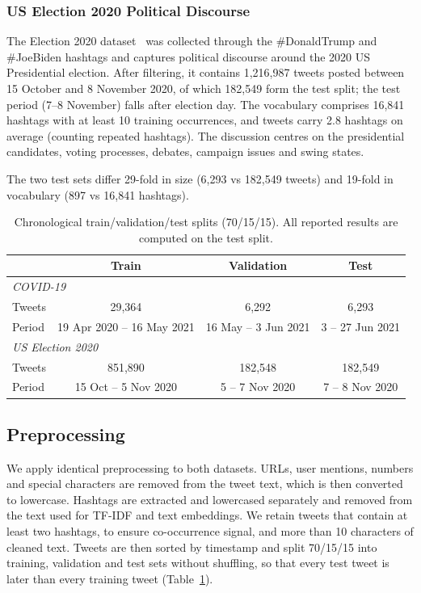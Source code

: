 \documentclass[pdflatex,sn-mathphys-num]{sn-jnl}%
\begin{document}
\subsubsection{US Election 2020 Political Discourse}\label{subsubsec5}

The Election 2020 dataset~\cite{election_kaggle} was collected through the \#DonaldTrump and \#JoeBiden hashtags and captures political discourse around the 2020 US Presidential election. After filtering, it contains 1,216,987 tweets posted between 15 October and 8 November 2020, of which 182,549 form the test split; the test period (7--8 November) falls after election day. The vocabulary comprises 16,841 hashtags with at least 10 training occurrences, and tweets carry 2.8 hashtags on average (counting repeated hashtags). The discussion centres on the presidential candidates, voting processes, debates, campaign issues and swing states.

The two test sets differ 29-fold in size (6,293 vs 182,549 tweets) and 19-fold in vocabulary (897 vs 16,841 hashtags).

\begin{table}[t]
\centering
\caption{Chronological train/validation/test splits (70/15/15). All reported results are computed on the test split.}
\label{tab:splits}
\begin{tabular}{lccc}
\toprule
 & Train & Validation & Test \\
\midrule
\multicolumn{4}{l}{\textit{COVID-19}} \\
Tweets & 29,364 & 6,292 & 6,293 \\
Period & 19 Apr 2020 -- 16 May 2021 & 16 May -- 3 Jun 2021 & 3 -- 27 Jun 2021 \\
\midrule
\multicolumn{4}{l}{\textit{US Election 2020}} \\
Tweets & 851,890 & 182,548 & 182,549 \\
Period & 15 Oct -- 5 Nov 2020 & 5 -- 7 Nov 2020 & 7 -- 8 Nov 2020 \\
\bottomrule
\end{tabular}
\end{table}

\subsection{Preprocessing}\label{subsec14}

We apply identical preprocessing to both datasets. URLs, user mentions, numbers and special characters are removed from the tweet text, which is then converted to lowercase. Hashtags are extracted and lowercased separately and removed from the text used for TF-IDF and text embeddings. We retain tweets that contain at least two hashtags, to ensure co-occurrence signal, and more than 10 characters of cleaned text. Tweets are then sorted by timestamp and split 70/15/15 into training, validation and test sets without shuffling, so that every test tweet is later than every training tweet (Table~\ref{tab:splits}).
\end{document}
